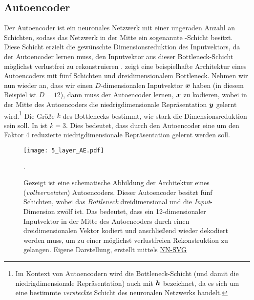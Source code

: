 \subsection{Autoencoder}
\label{ch:MethodenDerDimRed:modern:AE}

Der Autoencoder ist ein neuronales Netzwerk mit einer ungeraden Anzahl an Schichten, sodass das Netzwerk in der Mitte ein sogenannte -Schicht besitzt. Diese Schicht erzielt die gewünschte Dimensionsreduktion des Inputvektors, da der Autoencoder lernen muss, den Inputvektor aus dieser Bottleneck-Schicht möglichst verlustfrei zu rekonstruieren \parencites[502]{Goodfellow.2016}[2]{Bank.2020}.
 zeigt eine beispielhafte Architektur eines Autoencoders mit fünf Schichten und dreidimensionalem Bottleneck. Nehmen wir nun wieder an, dass wir einen
$D$-dimensionalen Inputvektor $\bm{x}$ haben (in diesem Beispiel ist $D = 12$), dann muss der Autoencoder lernen, $\bm{x}$ zu kodieren, wobei in der Mitte des Autoencoders die niedrigdimensionale Repräsentation $\bm{y}$ gelernt wird.\footnote{Im Kontext von Autoencodern wird die Bottleneck-Schicht (und damit die niedrigdimensionale Repräsentation) auch mit $\bm{h}$ bezeichnet, da es sich um eine bestimmte \textit{versteckte} Schicht des neuronalen Netzwerks handelt.} Die Größe $k$ des Bottlenecks bestimmt, wie stark die Dimensionsreduktion sein soll. In  ist $k = 3$. Dies bedeutet, dass durch den Autoencoder eine um den Faktor 4 reduzierte niedrigdimensionale Repräsentation gelernt werden soll.
\begin{figure}[h]
	\label{fig:5-layer-Autoencoder}
	\begin{center}
		\texttt{[image: 5\_layer\_AE.pdf]}
		\caption[Schematische Abbildung der Architektur eines Autoencoders]{Gezeigt ist eine schematische Abbildung der Architektur eines (\textit{vollvernetzten}) Autoencoders. Dieser Autoencoder besitzt fünf Schichten, wobei das \textit{Bottleneck} dreidimensional und die \textit{Input}-Dimension zwölf ist. Das bedeutet, dass ein 12-dimensionaler Inputvektor in der Mitte des Autoencoders durch einen dreidimensionalen Vektor kodiert und anschließend wieder dekodiert werden muss, um zu einer möglichst verlustfreien Rekonstruktion zu gelangen. Eigene Darstellung, erstellt mittels \href{https://alexlenail.me/NN-SVG/}{NN-SVG}}.
	\end{center}
\end{figure}

